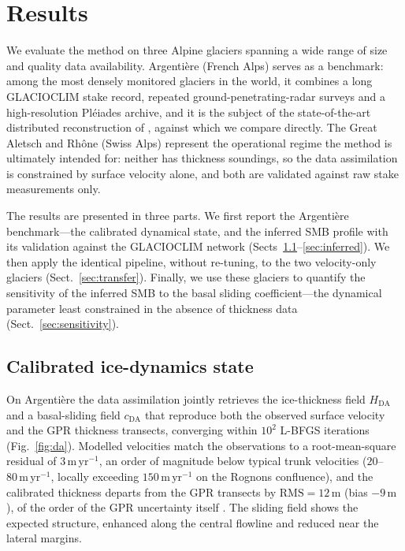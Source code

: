 \section{Results}\label{sec:results}


We evaluate the method on three Alpine glaciers spanning a wide range of size and quality
data availability. Argentière (French Alps) serves as a
benchmark: among the most densely monitored glaciers in the world, it combines a
long GLACIOCLIM stake record, repeated ground-penetrating-radar surveys and a
high-resolution Pléiades archive, and it is the subject of the state-of-the-art
distributed reconstruction of \citet{kneib2024}, against which we compare
directly. The Great Aletsch and Rhône (Swiss Alps) represent the operational regime
the method is ultimately intended for: neither has thickness soundings, so the
data assimilation is constrained by surface velocity alone, and both are
validated against raw stake measurements only.

The results are presented in three parts. We first report the Argentière
benchmark---the calibrated dynamical state, and the inferred SMB profile with its
validation against the GLACIOCLIM network
(Sects~\ref{sec:argentiere-da}--\ref{sec:inferred}). We then apply the
identical pipeline, without re-tuning, to the two velocity-only glaciers
(Sect.~\ref{sec:transfer}). Finally, we use these glaciers to quantify the
sensitivity of the inferred SMB to the basal sliding coefficient---the dynamical
parameter least constrained in the absence of thickness data
(Sect.~\ref{sec:sensitivity}).

\subsection{Calibrated ice-dynamics state}\label{sec:argentiere-da}

On Argentière the data assimilation jointly retrieves the ice-thickness field
$H_\mathrm{DA}$ and a basal-sliding field $c_\mathrm{DA}$ that reproduce both the
observed surface velocity and the GPR thickness transects, 
converging within
$10^2$ L-BFGS iterations (Fig.~\ref{fig:da}). Modelled velocities match the
observations to a root-mean-square residual of $3\,\mathrm{m\,yr^{-1}}$, an order
of magnitude below typical trunk velocities ($20$--$80\,\mathrm{m\,yr^{-1}}$,
locally exceeding $150\,\mathrm{m\,yr^{-1}}$ on the Rognons confluence), and the
calibrated thickness departs from the GPR transects by $\mathrm{RMS}=12\,\mathrm{m}$
(bias $-9\,\mathrm{m}$), of the order of the GPR uncertainty itself
\citep{rabatel2018}. The sliding field shows the expected structure, enhanced along
the central flowline and reduced near the lateral margins.

